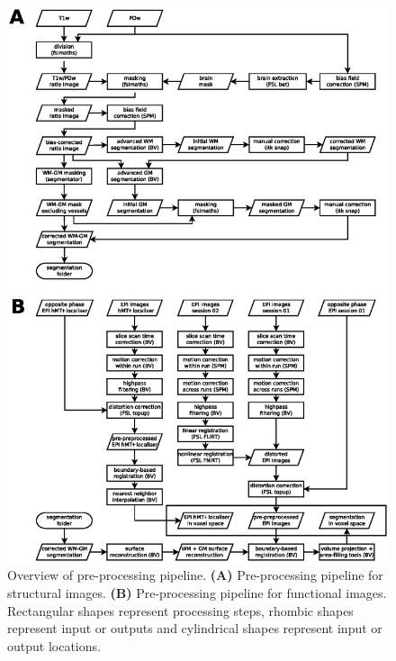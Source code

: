 \begin{figure}[htbp!]
\centering
\includegraphics[width=\textwidth]{figures/chapter_03_SI/figS11.eps}
\caption{Overview of pre-processing pipeline. \textbf{(A)} Pre-processing pipeline for structural images. \textbf{(B)} Pre-processing pipeline for functional images. Rectangular shapes represent processing steps, rhombic shapes represent input or outputs and cylindrical shapes represent input or output locations.}
\label{fig:figAB_proc}
\end{figure}

